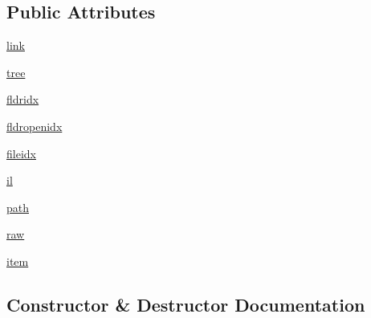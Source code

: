 \subsection*{Public Attributes}
\begin{DoxyCompactItemize}
\item 
\hyperlink{class_uni_dec_1_1unidec__modules_1_1tims__import__wizard_1_1import__wizard__treectrl_1_1_tree_ctrl_panel_ae53bfd35d6bbd51ca819fbe167566532}{link}
\item 
\hyperlink{class_uni_dec_1_1unidec__modules_1_1tims__import__wizard_1_1import__wizard__treectrl_1_1_tree_ctrl_panel_a8f6a2da972779d7f2eb778eb828a5e03}{tree}
\item 
\hyperlink{class_uni_dec_1_1unidec__modules_1_1tims__import__wizard_1_1import__wizard__treectrl_1_1_tree_ctrl_panel_a6a9ef65e059304f91ac6a33a671c0eda}{fldridx}
\item 
\hyperlink{class_uni_dec_1_1unidec__modules_1_1tims__import__wizard_1_1import__wizard__treectrl_1_1_tree_ctrl_panel_aa85e4a899dc2659f5295c8cc0b732e20}{fldropenidx}
\item 
\hyperlink{class_uni_dec_1_1unidec__modules_1_1tims__import__wizard_1_1import__wizard__treectrl_1_1_tree_ctrl_panel_a60575ad6c0913ff04d3451f6b3996e91}{fileidx}
\item 
\hyperlink{class_uni_dec_1_1unidec__modules_1_1tims__import__wizard_1_1import__wizard__treectrl_1_1_tree_ctrl_panel_a959244082742a79d575e8dadc39e52d5}{il}
\item 
\hyperlink{class_uni_dec_1_1unidec__modules_1_1tims__import__wizard_1_1import__wizard__treectrl_1_1_tree_ctrl_panel_ab61d4c43003fef6a9ba461f0559b8a6c}{path}
\item 
\hyperlink{class_uni_dec_1_1unidec__modules_1_1tims__import__wizard_1_1import__wizard__treectrl_1_1_tree_ctrl_panel_a1a010deabae45f0a442d61aa1591c281}{raw}
\item 
\hyperlink{class_uni_dec_1_1unidec__modules_1_1tims__import__wizard_1_1import__wizard__treectrl_1_1_tree_ctrl_panel_a2a74e3fb3b3a02122b42a9fe345aaee1}{item}
\end{DoxyCompactItemize}


\subsection{Constructor \& Destructor Documentation}
\hypertarget{class_uni_dec_1_1unidec__modules_1_1tims__import__wizard_1_1import__wizard__treectrl_1_1_tree_ctrl_panel_ab7b6bb4d0bd69d1ada92585c2e99b9a6}{}
